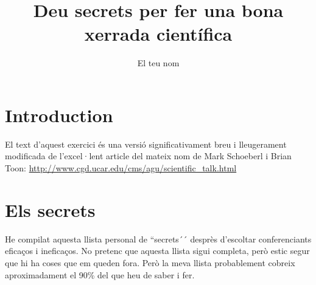 \documentclass[12pt]{article}
\title{Deu secrets per fer una bona xerrada científica}
\author{El teu nom}
\begin{document}
\maketitle

\section{Introduction}

El text d'aquest exercici és una versió significativament breu i lleugerament modificada de l'excel·lent article del mateix nom de Mark Schoeberl i Brian Toon:
\url {http://www.cgd.ucar.edu/cms/agu/scientific_talk.html}

\section{Els secrets}

He compilat aquesta llista personal de ``secrets´´ desprès d'escoltar conferenciants eficaços i ineficaços. No pretenc que aquesta llista sigui completa, però estic segur que hi ha coses que em queden fora. Però la meva llista probablement cobreix aproximadament el 90\% del que heu de saber i fer.
\end{document}
